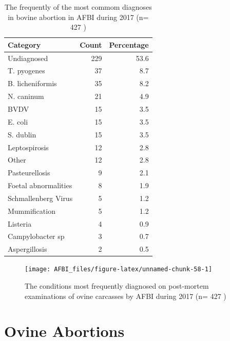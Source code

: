 \documentclass[]{book}
\begin{document}
\begin{table}

\caption{\label{tab:unnamed-chunk-57}The frequently of the most commom diagnoses in bovine abortion in  AFBI during 2017 (n= 427 )}
\centering
\begin{tabular}[t]{l|r|r}
\hline
Category & Count & Percentage\\
\hline
Undiagnosed & 229 & 53.6\\
\hline
T. pyogenes & 37 & 8.7\\
\hline
B. licheniformis & 35 & 8.2\\
\hline
N. caninum & 21 & 4.9\\
\hline
BVDV & 15 & 3.5\\
\hline
E. coli & 15 & 3.5\\
\hline
S. dublin & 15 & 3.5\\
\hline
Leptospirosis & 12 & 2.8\\
\hline
Other & 12 & 2.8\\
\hline
Pasteurellosis & 9 & 2.1\\
\hline
Foetal abnormalities & 8 & 1.9\\
\hline
Schmallenberg Virus & 5 & 1.2\\
\hline
Mummification & 5 & 1.2\\
\hline
Listeria & 4 & 0.9\\
\hline
Campylobacter sp & 3 & 0.7\\
\hline
Aspergillosis & 2 & 0.5\\
\hline
\end{tabular}
\end{table}

\begin{figure}

{\centering \texttt{[image: AFBI\_files/figure-latex/unnamed-chunk-58-1]} 

}

\caption{The conditions most frequently diagnosed on post-mortem examinations of  ovine carcasses by AFBI during 2017 (n= 427 )}\label{fig:unnamed-chunk-58}
\end{figure}

\chapter{Ovine Abortions}\label{ovine-abortions}
\end{document}
